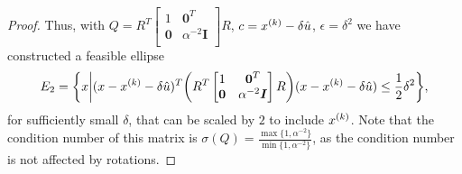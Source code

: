 \begin{proof}
Thus, with $Q = R^T\begin{bmatrix}
1 & \boldsymbol0^T \\
\boldsymbol 0 & \alpha^{-2} \boldsymbol I \\
\end{bmatrix}R$, $c = {x^{(k)}} - \delta \hat u$, $\epsilon = \delta^2$ we have constructed a feasible ellipse
\begin{align*}
E_2 = \bigg \{x \bigg | (x - {x^{(k)}} - \delta \hat u)^T\bigg(R^T\begin{bmatrix}
1 & \boldsymbol0^T \\
\boldsymbol 0 & \alpha^{-2} \boldsymbol I \\
\end{bmatrix}R\bigg)(x - {x^{(k)}} - \delta \hat u) \le \frac 1 2 \delta^2 \bigg\},
\end{align*}
for sufficiently small $\delta$, that can be scaled by $2$ to include ${x^{(k)}}$.
Note that the condition number of this matrix is $\sigma(Q) = \frac{\max\{1, \alpha^{-2}\}}{\min\{1, \alpha^{-2}\}}$,
as the condition number is not affected by rotations.


\end{proof}




% 




